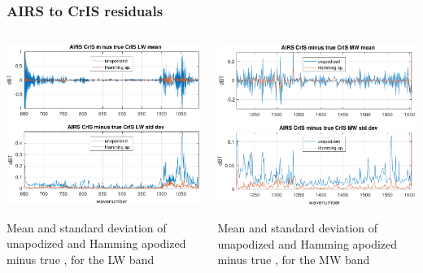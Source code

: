 \documentclass[10pt]{beamer}
\begin{document}
\begin{frame}
\frametitle{AIRS to CrIS residuals}
\begin{columns}[t]
\begin{column}{0.5\textwidth}
  \begin{centering}
  \includegraphics[width=\textwidth]{figures/a2cris_diff_LW.pdf}
  \end{centering}\vspace{3mm}
  Mean and standard deviation of unapodized and Hamming apodized
  {\airs} {\cris} minus true {\cris}, for the {\cris} LW band

\end{column}
\begin{column}{0.5\textwidth}  
  \begin{centering}
  \includegraphics[width=\textwidth]{figures/a2cris_diff_MW.pdf}
  \end{centering}\vspace{3mm}
  Mean and standard deviation of unapodized and Hamming apodized
  {\airs} {\cris} minus true {\cris}, for the {\cris} MW band

\end{column}
\end{columns}
\end{frame}
\end{document}
